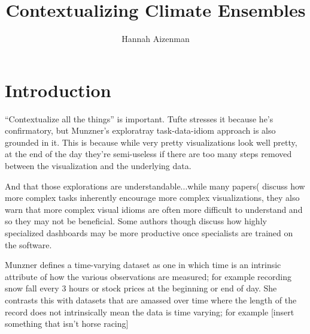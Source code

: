 \documentclass[letterpaper,onecolumn,titlepage]{Ythesis}
\title{Contextualizing Climate Ensembles}
\author{Hannah Aizenman}
\begin{document}
\makefrontmatter

\section{Introduction}

``Contextualize all the things'' is important. Tufte stresses it because he's
confirmatory, but Munzner's exploratray task-data-idiom approach is also
grounded in it. This is because while very pretty visualizations look well
pretty, at the end of the day they're semi-useless if there are too many steps
removed between the visualization and the underlying data. 


And that those explorations are understandable...while many papers(\cite{Munzner} \cite{Acquired Codes} \cite{...}discuss how more complex tasks inherently encourage more complex visualizations, they also warn that more complex visual idioms are often more difficult to understand and so they may not be beneficial. Some authors though discuss how highly specialized dashboards may be more productive once specialists are trained on the software.


Munzner \cite{Munzner14} defines a time-varying dataset as one in which time is an intrinsic attribute of how the various observations are measured; for example recording snow fall every 3 hours or stock prices at the beginning or end of day. She contrasts this with datasets that are amassed over time where the length of the record does not intrinsically mean the data is time varying; for example [insert something that isn't horse racing] 
\end{document}
